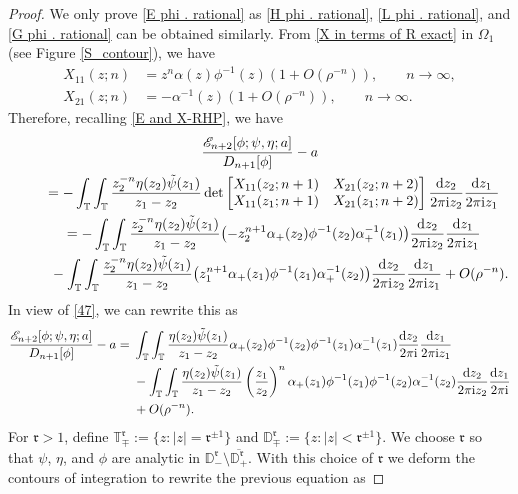 \documentclass[10pt,a4paper]{amsart}
\numberwithin{equation}{section}
\newcommand{\D}{{\mathbb D}}
\newcommand{\T}{{\mathbb T}}
\newcommand{\al}{\alpha}
\newcommand{\Om}{\Omega}
\newcommand{\ii}{{\rm i}}
\newcommand{\dd}{{\rm d}}
\begin{document}
		\begin{proof}
			We only prove \eqref{E phi . rational} as \eqref{H phi . rational}, \eqref{L phi . rational}, and \eqref{G phi . rational} can be obtained similarly. 			From \eqref{X in terms of R exact} in $\Om_1$ (see Figure \ref{S_contour}), we have
			\begin{align*}
				X_{11}(z;n) & = z^n \al(z) \phi^{-1}(z) ( 1+ O(\rho^{-n})),\qquad n \to \infty, \\
				X_{21}(z;n) & = - \al^{-1}(z) ( 1+ O(\rho^{-n})),\qquad n \to \infty.
			\end{align*}
			Therefore, recalling \eqref{E and X-RHP}, we have
			\begin{gather*}
					\frac{\mathscr{E}_{n+2}[\phi;\psi, \eta ;a]}{D_{n+1}[\phi]} - a \\
\qquad = - \int_{\T} \int_{\T} \frac{z^{-n}_2\eta(z_2) \Tilde{\psi}(z_1)}{z_1-z_2} \det \begin{bmatrix}
						X_{11}(z_2;n+1) & X_{21}(z_2;n+2) \\
						X_{11}(z_1;n+1) & X_{21}(z_1;n+2)
					\end{bmatrix} \frac{\dd z_2}{2 \pi \ii z_2} \frac{\dd z_1}{2 \pi \ii z_1} \\
\qquad= - \int_{\T} \int_{\T} \frac{z^{-n}_2\eta(z_2) \Tilde{\psi}(z_1)}{z_1-z_2} \bigl( - z^{n+1}_2 \al_+(z_2) \phi^{-1}(z_2) \al^{-1}_+(z_1) \bigr)\frac{\dd z_2}{2 \pi \ii z_2} \frac{\dd z_1}{2 \pi \ii z_1} \\
\phantom{\qquad=}{} - \int_{\T} \int_{\T} \frac{z^{-n}_2\eta(z_2) \Tilde{\psi}(z_1)}{z_1-z_2} \big( z^{n+1}_1 \al_+(z_1) \phi^{-1}(z_1) \al^{-1}_+(z_2) \big)\frac{\dd z_2}{2 \pi \ii z_2} \frac{\dd z_1}{2 \pi \ii z_1} + O(\rho^{-n}).
			\end{gather*}
			In view of \eqref{47}, we can rewrite this as
			\begin{align*}
					\frac{\mathscr{E}_{n+2}[\phi;\psi, \eta ;a]}{D_{n+1}[\phi]} - a ={} &\int_{\T} \int_{\T} \frac{\eta(z_2) \Tilde{\psi}(z_1)}{z_1-z_2} \al_+(z_2) \phi^{-1}(z_2) \phi^{-1}(z_1) \al^{-1}_-(z_1) \frac{\dd z_2}{2 \pi \ii } \frac{\dd z_1}{2 \pi \ii z_1} \\
 & - \int_{\T} \int_{\T} \frac{\eta(z_2) \Tilde{\psi}(z_1)}{z_1-z_2} \left( \frac{z_1}{z_2} \right)^n \al_+(z_1) \phi^{-1}(z_1) \phi^{-1}(z_2) \al^{-1}_-(z_2) \frac{\dd z_2}{2 \pi \ii z_2} \frac{\dd z_1}{2 \pi \ii }\\
 & + O(\rho^{-n}).
			\end{align*}
			For $\mathfrak{r}>1$, define $	\T^{\mathfrak{r}}_{\mp} := \big\{ z\colon |z|= \mathfrak{r}^{\pm1} \big\}$ and $	\D^{\mathfrak{r}}_{\mp} := \big\{ z\colon |z|< \mathfrak{r}^{\pm1} \big\}$. We choose $\mathfrak{r}$ so that $\psi$, $\eta$, and $\phi$ are analytic in $\D^{\mathfrak{r}}_- \setminus \overline{\D^{\mathfrak{r}}_+}$. With this choice of $\mathfrak{r}$ we deform the contours of integration to rewrite the previous equation as

\end{proof}
\end{document}

